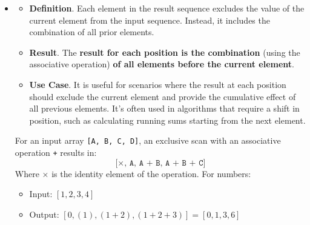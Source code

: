 \begin{itemize}
    \item {}
    \begin{itemize}
        \item[\textcolor{Red2}{\faIcon{book}}] \textcolor{Red2}{\textbf{Definition}}. Each element in the result sequence excludes the value of the current element from the input sequence. Instead, it includes the combination of all prior elements.
    
        \item[\textcolor{Green3}{\faIcon{poll}}] \textcolor{Green3}{\textbf{Result}}. The \textbf{result for each position is the combination} (using the associative operation) \textbf{of all elements before the current element}.

        \item[\textcolor{Green3}{\faIcon{check-circle}}] \textcolor{Green3}{\textbf{Use Case}}. It is useful for scenarios where the result at each position should exclude the current element and provide the cumulative effect of all previous elements. It's often used in algorithms that require a shift in position, such as calculating running sums starting from the next element.
    \end{itemize}
    \begin{examplebox}
        For an input array \texttt{[A, B, C, D]}, an exclusive scan with an associative operation \texttt{+} results in:
        \begin{equation*}
            \texttt{[$\times$, A, A + B, A + B + C]}
        \end{equation*}
        Where $\times$ is the identity element of the operation. For numbers:
        \begin{itemize}
            \item Input: $\left[1, 2, 3, 4\right]$
            \item Output: $\left[0, (1), (1 + 2), (1 + 2 + 3)\right] = \left[0, 1, 3, 6\right]$
        \end{itemize}
    \end{examplebox}
\end{itemize}

